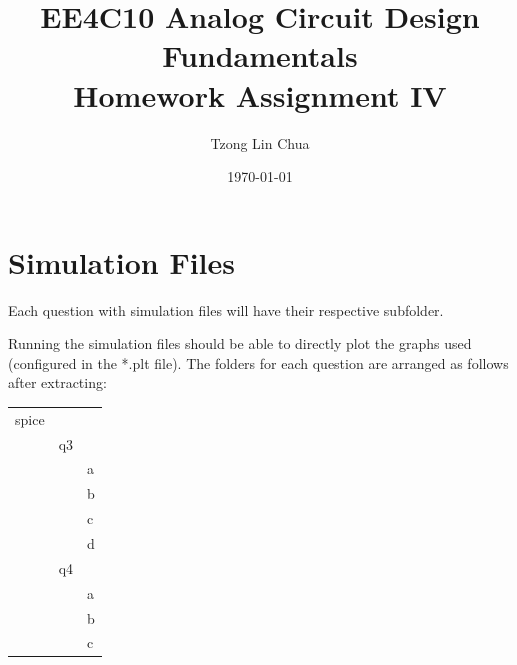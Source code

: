 \documentclass{article}
\author{Tzong Lin Chua}
\date{\today}
\title{EE4C10 Analog Circuit Design Fundamentals\\\medskip
\large Homework Assignment IV }
\begin{document}
\maketitle
\tableofcontents


\section{Simulation Files}
\label{sec:org7ffe627}
Each question with simulation files will have their respective subfolder.

Running the simulation files should be able to directly plot the graphs used (configured in the *.plt file).
The folders for each question are arranged as follows after extracting:

\begin{center}
\begin{tabular}{lll}
\hline
spice &  & \\
 & q3 & \\
 &  & a\\
 &  & b\\
 &  & c\\
 &  & d\\
 & q4 & \\
 &  & a\\
 &  & b\\
 &  & c\\
\hline
\end{tabular}
\end{center}
\end{document}
